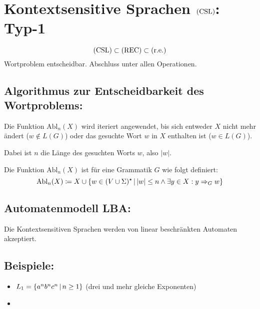 \chapter{Kontextsensitive Sprachen $\mathrm{(CSL)}$: Typ-1}
\begin{equation*}
	\mathrm{(CSL)}\subset\mathrm{(REC)}\subset\mathrm{(r.e.)}
\end{equation*}
Wortproblem entscheidbar. Abschluss unter allen Operationen.

\section{Algorithmus zur Entscheidbarkeit des Wortproblems:}
Die Funktion $\mathrm{Abl}_n(X)$ wird iteriert angewendet, bis sich entweder $X$ nicht mehr ändert ($w\not\in L(G)$) oder das gesuchte Wort $w$ in $X$ enthalten ist ($w\in L(G)$).

Dabei ist $n$ die Länge des gesuchten Worts $w$, also $|w|$.

Die Funktion $\mathrm{Abl}_n(X)$ ist für eine Grammatik $G$ wie folgt definiert:
\begin{equation*}
	\mathrm{Abl}_n(X)\coloneqq X\cup\left\{ w\in(V\cup\Sigma)^\star \,\middle|\, |w|\leq n \wedge \exists y\in X:y\Rightarrow_G w \right\}
\end{equation*}


\section{Automatenmodell LBA:}
Die Kontextsensitiven Sprachen werden von linear beschränkten Automaten akzeptiert.



\section{Beispiele: }
\begin{itemize}
	\item $L_1=\left\{ a^nb^nc^n \,\middle|\, n\geq 1 \right\}$ (drei und mehr gleiche Exponenten)
	\item
\end{itemize}
